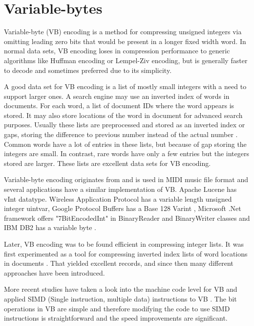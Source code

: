 \chapter{Variable-bytes}

Variable-byte (VB) encoding \citep{Wil99} is a method for compressing unsigned integers via omitting leading zero bits that would be present in a longer fixed 
width word. In normal data sets, VB encoding loses in compression performance to generic algorithms like Huffman encoding or Lempel-Ziv encoding, but 
is generally faster to decode \citep{Bri09} and sometimes preferred due to its simplicity. 

A good data set for VB encoding is a list of mostly small integers with a need to support larger ones. A search engine may use an inverted index of 
words in documents. For each word, a list of document IDs where the word appears is stored. It may also store locations of the word in document for 
advanced search purposes. Usually these lists are preprocessed and stored as an inverted index or gaps, storing the difference to previous number 
instead of the actual number \citep{Man08}. Common words have a lot of entries in these lists, but because of gap storing the integers are small. 
In contrast, rare words have only a few entries but the integers stored are larger. These lists are excellent data sets for VB encoding. 

Variable-byte encoding originates from and is used in MIDI music file format \citep{Mid96} and several applications have a similar implementation of VB. Apache 
Lucene has vInt datatype. Wireless Application Protocol has a variable length unsigned integer uintvar, Google Protocol Buffers has a Base 128 Varint \citep{GooPB},
 Microsoft .Net framework offers "7BitEncodedInt" in BinaryReader and BinaryWriter classes and IBM DB2 has a variable byte  \citep{Bha09}.

Later, VB encoding was to 
be found efficient in compressing integer lists. It was first experimented as a tool for compressing inverted index lists of word locations in documents \citep{Sch02}. 
That yielded excellent records, and since then many different approaches have been introduced. 

More recent studies have taken a look into the machine code level for VB and applied SIMD (Single instruction, multiple data) instructions to VB \citep{Lem18,Pla15}. The bit 
operations in VB are simple and therefore modifying the code to use SIMD instructions is straightforward and the speed improvements are significant. 

